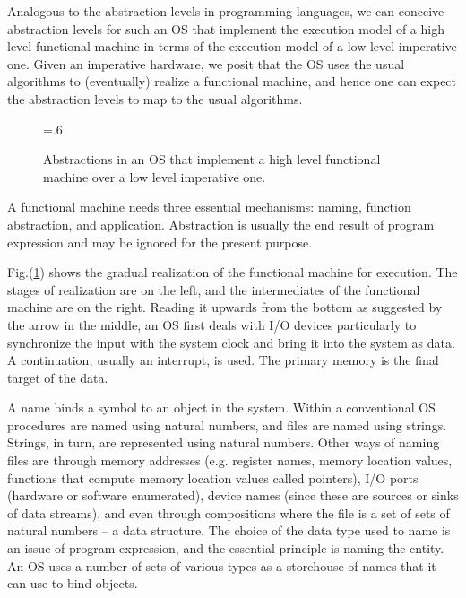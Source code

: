\documentclass[draft]{article}
\def\figdir{.}
\begin{document}
Analogous to  the abstraction levels in programming  languages, we can
conceive  abstraction  levels  for  such  an  OS  that  implement  the
execution model  of a  high level functional  machine in terms  of the
execution model  of a low  level imperative one.  Given  an imperative
hardware,  we  posit  that  the   OS  uses  the  usual  algorithms  to
(eventually) realize  a functional machine,  and hence one  can expect
the abstraction levels to map to the usual algorithms.
\begin{figure}[t]
  \centering
  \epsfxsize=.6\linewidth
  \epsffile{\figdir/os-abs-1.eps}
  \caption[Abstractions in an OS]{Abstractions in an OS that implement
    a high level functional machine over a low level imperative one.}
  \label{fig:os:abstractions}
\end{figure}
A  functional  machine   needs  three  essential  mechanisms:  naming,
function abstraction, and application.  Abstraction is usually the end
result  of program  expression  and  may be  ignored  for the  present
purpose.     

Fig.(\ref{fig:os:abstractions}) shows  the gradual realization  of the
functional machine  for execution.  The  stages of realization  are on
the left, and  the intermediates of the functional  machine are on the
right.  Reading it  upwards from the bottom as  suggested by the arrow
in  the middle, an  OS first  deals with  I/O devices  particularly to
synchronize  the input with  the system  clock and  bring it  into the
system as data.   A continuation, usually an interrupt,  is used.  The
primary memory is the final target of the data.

A  name  binds  a  symbol  to  an object  in  the  system.   Within  a
conventional OS procedures are  named using natural numbers, and files
are  named using  strings.  Strings,  in turn,  are  represented using
natural  numbers.   Other ways  of  naming  files  are through  memory
addresses  (e.g.  register  names, memory  location  values, functions
that  compute  memory  location  values called  pointers),  I/O  ports
(hardware  or  software enumerated),  device  names  (since these  are
sources or sinks of data streams), and even through compositions where
the file is a set of sets of natural numbers -- a data structure.  The
choice  of  the  data  type  used  to name  is  an  issue  of  program
expression, and the  essential principle is naming the  entity.  An OS
uses a number  of sets of various types as a  storehouse of names that
it can use to bind objects.
\end{document}
